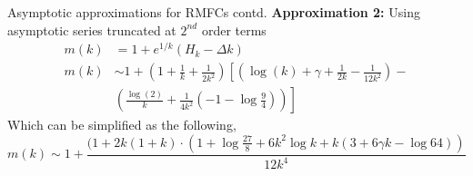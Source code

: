 \documentclass{beamer}
\begin{document}
\begin{frame}{Asymptotic approximations for RMFCs contd.}
\textbf{Approximation 2:} Using asymptotic series truncated at $2^{nd}$ order terms
\begin{equation*}
    \begin{aligned}
    m(k)&=1+e^{1/k}\left( H_k - \Delta k \right)\\
    m(k)& \sim 1+\left(1+\frac{1}{k}+\frac{1}{2 k^2} \right) \left[ \left( \log(k)+\gamma+\frac{1}{2k}-\frac{1}{12k^2} \right) \right.-\\
    &\left. \left( \frac{\log(2)}{k}+\frac{1}{4k^2}\left( -1-\log \frac{9}{4}\right) \right)\right]
\end{aligned}
\end{equation*}
Which can be simplified as the following,
\begin{equation}
    m(k) \sim 1+\frac{(1+2k(1+k)\cdot(1+\log\frac{27}{8}+6k^2 \log k +k(3+6\gamma k-\log 64))}{12k^4}
\end{equation}
    
\end{frame}
\end{document}
